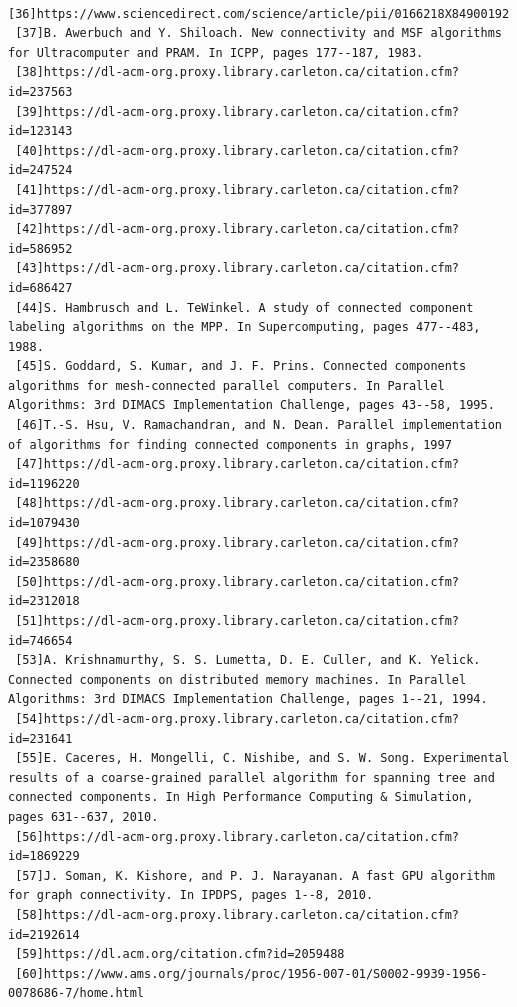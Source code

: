 \documentclass[]{article}
\begin{document}
\begin{verbatim}
 [36]https://www.sciencedirect.com/science/article/pii/0166218X84900192
 [37]B. Awerbuch and Y. Shiloach. New connectivity and MSF algorithms for Ultracomputer and PRAM. In ICPP, pages 177--187, 1983.
 [38]https://dl-acm-org.proxy.library.carleton.ca/citation.cfm?id=237563
 [39]https://dl-acm-org.proxy.library.carleton.ca/citation.cfm?id=123143
 [40]https://dl-acm-org.proxy.library.carleton.ca/citation.cfm?id=247524
 [41]https://dl-acm-org.proxy.library.carleton.ca/citation.cfm?id=377897
 [42]https://dl-acm-org.proxy.library.carleton.ca/citation.cfm?id=586952
 [43]https://dl-acm-org.proxy.library.carleton.ca/citation.cfm?id=686427
 [44]S. Hambrusch and L. TeWinkel. A study of connected component labeling algorithms on the MPP. In Supercomputing, pages 477--483, 1988.
 [45]S. Goddard, S. Kumar, and J. F. Prins. Connected components algorithms for mesh-connected parallel computers. In Parallel Algorithms: 3rd DIMACS Implementation Challenge, pages 43--58, 1995.
 [46]T.-S. Hsu, V. Ramachandran, and N. Dean. Parallel implementation of algorithms for finding connected components in graphs, 1997
 [47]https://dl-acm-org.proxy.library.carleton.ca/citation.cfm?id=1196220
 [48]https://dl-acm-org.proxy.library.carleton.ca/citation.cfm?id=1079430
 [49]https://dl-acm-org.proxy.library.carleton.ca/citation.cfm?id=2358680
 [50]https://dl-acm-org.proxy.library.carleton.ca/citation.cfm?id=2312018
 [51]https://dl-acm-org.proxy.library.carleton.ca/citation.cfm?id=746654
 [53]A. Krishnamurthy, S. S. Lumetta, D. E. Culler, and K. Yelick. Connected components on distributed memory machines. In Parallel Algorithms: 3rd DIMACS Implementation Challenge, pages 1--21, 1994.
 [54]https://dl-acm-org.proxy.library.carleton.ca/citation.cfm?id=231641
 [55]E. Caceres, H. Mongelli, C. Nishibe, and S. W. Song. Experimental results of a coarse-grained parallel algorithm for spanning tree and connected components. In High Performance Computing & Simulation, pages 631--637, 2010.
 [56]https://dl-acm-org.proxy.library.carleton.ca/citation.cfm?id=1869229
 [57]J. Soman, K. Kishore, and P. J. Narayanan. A fast GPU algorithm for graph connectivity. In IPDPS, pages 1--8, 2010.
 [58]https://dl-acm-org.proxy.library.carleton.ca/citation.cfm?id=2192614
 [59]https://dl.acm.org/citation.cfm?id=2059488
 [60]https://www.ams.org/journals/proc/1956-007-01/S0002-9939-1956-0078686-7/home.html
  \end{verbatim}
\end{document}
